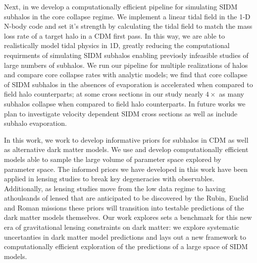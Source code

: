 Next, in  we develop a computationally efficient pipeline for simulating SIDM subhalos in the core collapse regime. 
We implement a linear tidal field in the 1-D N-body code \nsphere and set it's strength by calculating the tidal field to match the mass loss rate of a target halo in a CDM first pass. 
In this way, we are able to realistically model tidal physics in 1D, greatly reducing the computational requirments of simulating SIDM subhalos enabling previosly infeasible studies of large numbers of subhalos. 
We run our pipeline for multiple realizations of \gal halos and compare core collapse rates with analytic models; we find that core collapse of SIDM subhalos in the absences of evaporation is accelerated when compared to field halo counterparts; at some cross sections in our study nearly $4 \times$ as many subhalos collapse when compared to field halo counterparts.
In future works we plan to investigate velocity dependent SIDM cross sections as well as include subhalo evaporation.

In this work, we work to develop informative priors for subhalos in CDM as well as alternative dark matter models. 
We use and develop computationally efficient models able to sample the large volume of parameter space explored by parameter space. 
The informed priors we have developed in this work have been applied in lensing studies to break key degeneracies with observables. 
Additionally, as lensing studies move from the low data regime to having athoulsands of lensed that are anticipated to be discovered by the Rubin, Euclid and Roman missions these priors will transition into testable predictions of the dark matter models themselves.
Our work explores sets a benchmark for this new era of gravitational lensing constraints on dark matter: we explore systematic uncertanties in dark matter model predictions and lays out a new framework to computationally efficient exploration of the predictions of a large space of SIDM models.

